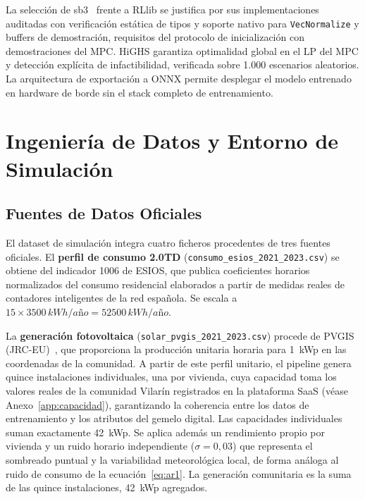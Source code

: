 \documentclass[12pt, a4paper, twoside]{report}
\begin{document}
La selección de \acrshort{sb3}~\citep{Raffin2021} frente a RLlib se justifica
por sus
implementaciones auditadas con verificación estática de tipos y soporte nativo
para \texttt{VecNormalize} y buffers de demostración, requisitos del protocolo
de inicialización con demostraciones del MPC. HiGHS garantiza optimalidad global
en el LP del MPC y detección explícita de infactibilidad, verificada sobre 1.000
escenarios aleatorios. La arquitectura de exportación a ONNX permite desplegar
el modelo entrenado en hardware de borde sin el stack completo de entrenamiento.

\section{Ingeniería de Datos y Entorno de Simulación}
\label{sec:datos}

\subsection{Fuentes de Datos Oficiales}

El dataset de simulación integra cuatro ficheros procedentes de tres fuentes
oficiales. El \textbf{perfil de consumo 2.0TD} (\texttt{consumo\_esios\_2021\_2023.csv})
se obtiene del indicador 1006 de ESIOS, que publica coeficientes
horarios normalizados del consumo residencial elaborados a partir de medidas
reales de contadores inteligentes de la red española. Se escala a
$15 \times \num{3500}\,kWh/año = \num{52500}\,kWh/año$.

La \textbf{generación fotovoltaica} (\texttt{solar\_pvgis\_2021\_2023.csv})
procede de PVGIS (JRC-EU)~\citep{PVGIS2022}, que proporciona la producción
unitaria horaria para
\SI{1}{kWp} en las coordenadas de la comunidad. A partir de este perfil unitario,
el pipeline genera quince instalaciones individuales, una por vivienda, cuya
capacidad toma los valores reales de la comunidad Vilarín registrados en la
plataforma SaaS (véase Anexo~\ref{app:capacidad}), garantizando la coherencia
entre los datos de entrenamiento y los atributos del gemelo digital. Las
capacidades individuales suman exactamente \SI{42}{kWp}. Se aplica además un
rendimiento propio por vivienda y un ruido horario independiente
($\sigma = 0{,}03$) que representa el sombreado puntual y la variabilidad
meteorológica local, de forma análoga al ruido de consumo de la
ecuación~\eqref{eq:ar1}. La generación comunitaria es la suma de las quince
instalaciones, \SI{42}{kWp} agregados.
\end{document}
